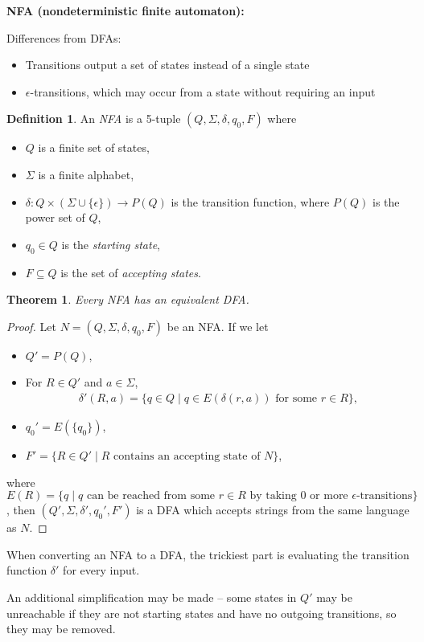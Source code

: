 \documentclass[a4paper,12pt]{article}
\newtheorem{theorem}{Theorem}
\theoremstyle{remark}
\theoremstyle{definition}
\newtheorem{definition}{Definition}
\begin{document}
\textbf{NFA (nondeterministic finite automaton):} \par
Differences from DFAs:
\begin{itemize}
    \item
        Transitions output a set of states instead of a single state
    \item
        $\epsilon$-transitions, which may occur from a state without requiring an input
\end{itemize}
\begin{definition}
    An \emph{NFA} is a 5-tuple $(Q, \Sigma, \delta, q_0, F)$ where
    \begin{itemize}
        \item
            $Q$ is a finite set of states,
        \item
            $\Sigma$ is a finite alphabet,
        \item
            $\delta : Q \times (\Sigma \cup \{\epsilon\}) \to P(Q)$ is the transition function, where $P(Q)$ is the power set of $Q$,
        \item
            $q_0 \in Q$ is the \emph{starting state},
        \item
            $F \subseteq Q$ is the set of \emph{accepting states}.
    \end{itemize}
\end{definition}
\begin{theorem}
    Every NFA has an equivalent DFA.
\end{theorem}
\begin{proof}
    Let $N = (Q, \Sigma, \delta, q_0, F)$ be an NFA. If we let
    \begin{itemize}
        \item
            $Q' = P(Q)$,
        \item
            For $R \in Q'$ and $a \in \Sigma$,
            \begin{align*}
                \delta'(R, a) = \{ q \in Q \mid q \in E(\delta(r, a)) \text{ for some } r \in R \},
            \end{align*}
        \item
            $q_0' = E(\{ q_0 \})$,
        \item
            $F' = \{ R \in Q' \mid R \text{ contains an accepting state of } N \}$,
    \end{itemize}
    where $E(R) = \{ q \mid q \text{ can be reached from some $r \in R$ by taking $0$ or more $\epsilon$-transitions} \}$, then $(Q', \Sigma, \delta', q_0', F')$ is a DFA which accepts strings from the same language as $N$.
\end{proof}
When converting an NFA to a DFA, the trickiest part is evaluating the transition function $\delta'$ for every input. \par
An additional simplification may be made -- some states in $Q'$ may be unreachable if they are not starting states and have no outgoing transitions, so they may be removed.
\end{document}

